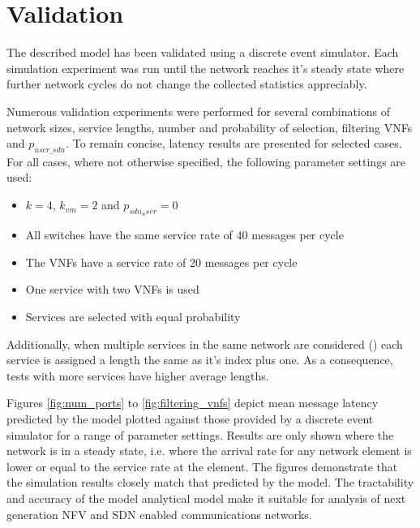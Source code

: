 
\section{Validation}
\label{sec:validation}
The described model has been validated using a discrete event simulator. Each simulation experiment was run until the network reaches it's steady state where further network cycles do not change the collected statistics appreciably. 

Numerous validation experiments were performed for several combinations of network sizes, service lengths, number and probability of selection, filtering VNFs and $p_{user\_sdn}$. To remain concise, latency results are presented for selected cases. For all cases, where not otherwise specified, the following parameter settings are used:

\begin{itemize}
\item $k = 4$, $k_{vm} = 2$ and $p_{sdn_user} = 0$
\item All switches have the same service rate of 40 messages per cycle
\item The VNFs have a service rate of 20 messages per cycle
\item One service with two VNFs is used
\item Services are selected with equal probability
\end{itemize}

Additionally, when multiple services in the same network are considered () each service is assigned a length the same as it's index plus one. As a consequence, tests with more services have higher average lengths.

Figures \ref{fig:num_ports} to \ref{fig:filtering_vnfs} depict mean message latency predicted by the model plotted against those provided by a discrete event simulator for a range of parameter settings. Results are only shown where the network is in a steady state, i.e. where the arrival rate for any network element is lower or equal to the service rate at the element. The figures demonstrate that the simulation results closely match that predicted by the model. The tractability and accuracy of the model analytical model make it suitable for analysis of next generation NFV and SDN enabled communications networks.


